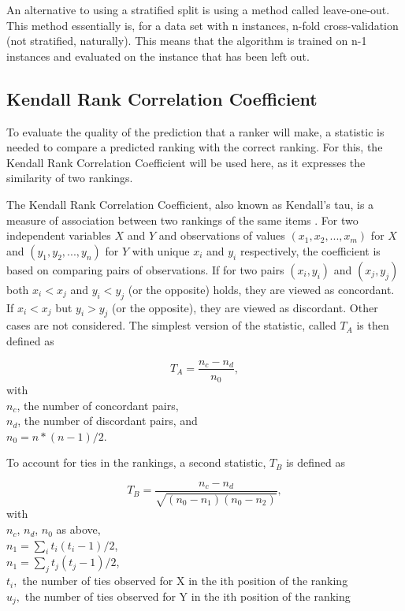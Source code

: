 An alternative to using a stratified split is using a method called leave-one-out. This method essentially is, for a data set with n instances, n-fold cross-validation (not stratified, naturally). This means that the algorithm is trained on n-1 instances and evaluated on the instance that has been left out.

\subsection{Kendall Rank Correlation Coefficient}
To evaluate the quality of the prediction that a ranker will make, a statistic is needed to compare a predicted ranking with the correct ranking. For this, the Kendall Rank Correlation Coefficient will be used here, as it expresses the similarity of two rankings.

The Kendall Rank Correlation Coefficient, also known as Kendall's tau, is a measure of association between two rankings of the same items \cite{kendall1938new}. For two independent variables $X$ and $Y$ and observations of values $(x_1,x_2,...,x_m)$ for $X$ and $(y_1,y_2,...,y_n)$ for $Y$ with unique $x_i$ and $y_i$ respectively, the coefficient is based on comparing pairs of observations. If for two pairs $(x_i,y_i)$ and $(x_j,y_j)$ both $x_i < x_j$ and $y_i < y_j$ (or the opposite) holds, they are viewed as concordant. If $x_i < x_j$ but $y_i > y_j$ (or the opposite), they are viewed as discordant. Other cases are not considered. The simplest version of the statistic, called $T_A$ is then defined as 

$$T_A = \frac{n_c - n_d}{n_0},$$
with \\
$n_c$, the number of concordant pairs, \\
$n_d$, the number of discordant pairs, and \\
$n_0 = n * (n - 1) / 2$.

To account for ties in the rankings, a second statistic, $T_B$ is defined as

$$T_B = \frac{n_c - n_d}{\sqrt{(n_0 - n_1 )(n_0 - n_2 )}},$$
with \\
$n_c$, $n_d$, $n_0$ as above, \\
$n_1=\sum_i{t_i(t_i-1)/2}$, \\
$n_1=\sum_j{t_j(t_j-1)/2}$, \\
$t_i,$ the number of ties observed for X in the ith position of the ranking \\
$u_j,$ the number of ties observed for Y in the ith position of the ranking 

